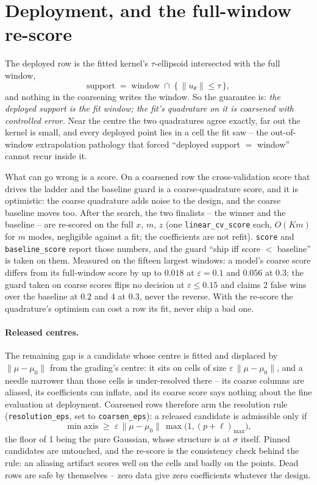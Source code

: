 \documentclass[11pt]{article}
\newcommand{\eps}{\varepsilon}
\newcommand{\code}[1]{\texttt{#1}}
\begin{document}
\section{Deployment, and the full-window re-score}

The deployed row is the fitted kernel's $\tau$-ellipsoid intersected with the
full window,
\begin{equation}
\text{support} \;=\; \text{window} \;\cap\; \{\, \|u_\theta\| \le \tau \,\},
\label{eq:support}
\end{equation}
and nothing in the coarsening writes the window. So the guarantee is:
\emph{the deployed support is the fit window; the fit's quadrature on it is
coarsened with controlled error.} Near the centre the two quadratures agree
exactly, far out the kernel is small, and every deployed point lies in a cell
the fit saw -- the out-of-window extrapolation pathology that forced
``deployed support $=$ window'' cannot recur inside it.

What can go wrong is a score. On a coarsened row the cross-validation score
that drives the ladder and the baseline guard is a coarse-quadrature score,
and it is optimistic: the coarse quadrature adds noise to the design, and the
coarse baseline moves too. After the search, the two finalists -- the winner
and the baseline -- are re-scored on the full $x$, $m$, $z$ (one
\code{linear\_cv\_score} each, $O(Km)$ for $m$ modes, negligible against a
fit; the coefficients are not refit). \code{score} and
\code{baseline\_score} report those numbers, and the guard ``ship iff score
$<$ baseline'' is taken on them. Measured on the fifteen largest windows: a
model's coarse score differs from its full-window score by up to $0.018$ at
$\eps = 0.1$ and $0.056$ at $0.3$; the guard taken on coarse scores flips no
decision at $\eps \le 0.15$ and claims 2 false wins over the baseline at
$0.2$ and 4 at $0.3$, never the reverse. With the re-score the quadrature's
optimism can cost a row its fit, never ship a bad one.

\paragraph{Released centres.} The remaining gap is a candidate whose centre
is fitted and displaced by $\|\mu - \mu_0\|$ from the grading's centre: it
sits on cells of size $\eps\,\|\mu - \mu_0\|$, and a needle narrower than
those cells is under-resolved there -- its coarse columns are aliased, its
coefficients can inflate, and its coarse score says nothing about the fine
evaluation at deployment. Coarsened rows therefore arm the resolution rule
(\code{resolution\_eps}, set to \code{coarsen\_eps}): a released candidate is
admissible only if
\begin{equation}
\min \text{axis} \;\ge\; \eps\, \|\mu - \mu_0\|\, \max\big(1, (p + \ell)_{\max}\big),
\label{eq:released}
\end{equation}
the floor of 1 being the pure Gaussian, whose structure is at $\sigma$
itself. Pinned candidates are untouched, and the re-score is the consistency
check behind the rule: an aliasing artifact scores well on the cells and
badly on the points. Dead rows are safe by themselves -- zero data give zero
coefficients whatever the design.
\end{document}
